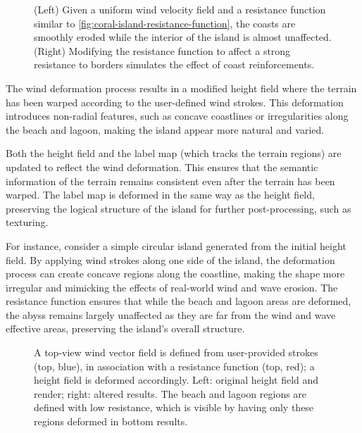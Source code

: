 \begin{figure}[H]
\caption{(Left) Given a uniform wind velocity field and a resistance function similar to \cref{fig:coral-island-resistance-function}, the coasts are smoothly eroded while the interior of the island is almost unaffected. (Right) Modifying the resistance function to affect a strong resistance to borders simulates the effect of coast reinforcements.}
\end{figure}


The wind deformation process results in a modified height field where the terrain has been warped according to the user-defined wind strokes. This deformation introduces non-radial features, such as concave coastlines or irregularities along the beach and lagoon, making the island appear more natural and varied.

Both the height field and the label map (which tracks the terrain regions) are updated to reflect the wind deformation. This ensures that the semantic information of the terrain remains consistent even after the terrain has been warped. The label map is deformed in the same way as the height field, preserving the logical structure of the island for further post-processing, such as texturing.

For instance, consider a simple circular island generated from the initial height field. By applying wind strokes along one side of the island, the deformation process can create concave regions along the coastline, making the shape more irregular and mimicking the effects of real-world wind and wave erosion. The resistance function ensures that while the beach and lagoon areas are deformed, the abyss remains largely unaffected as they are far from the wind and wave effective areas, preserving the island's overall structure.

\begin{figure}
\caption{A top-view wind vector field is defined from user-provided strokes (top, blue), in association with a resistance function (top, red); a height field is deformed accordingly. Left: original height field and render; right: altered results. The beach and lagoon regions are defined with low resistance, which is visible by having only these regions deformed in bottom results.}
\label{fig:coral-island-wind-effect-result}
\end{figure}

